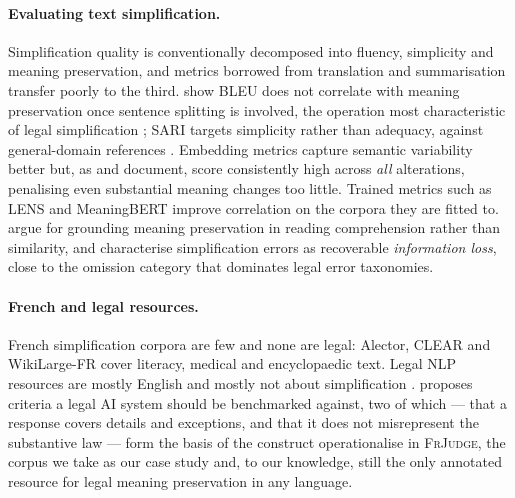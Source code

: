 \documentclass[11pt]{article}
\begin{document}
\paragraph{Evaluating text simplification.}
Simplification quality is conventionally decomposed into fluency, simplicity and
meaning preservation, and metrics borrowed from translation and summarisation
transfer poorly to the third. \citet{sulem2018bleu} show BLEU
\citep{papineni2002bleu} does not correlate with meaning preservation once
sentence splitting is involved, the operation most characteristic of legal
simplification \citep{garimella2022text}; SARI
\citep{xu-etal-2016-optimizing} targets simplicity rather than adequacy, against
general-domain references \citep{alvamanchego2020asset}. Embedding metrics
\citep{zhang2019bertscore,reimers2019sbert} capture semantic variability better
but, as \citet{cripwell2024document} and \citet{kew2023bless} document, score
consistently high across \emph{all} alterations, penalising even substantial
meaning changes too little. Trained metrics such as LENS
\citep{maddela2023lens} and MeaningBERT \citep{beauchemin2023meaningbert}
improve correlation on the corpora they are fitted to.
\citet{agrawal2024meaning} argue for grounding meaning preservation in reading
comprehension rather than similarity, and \citet{trienes2024infolossqa}
characterise simplification errors as recoverable \emph{information loss},
close to the omission category that dominates legal error taxonomies.

\paragraph{French and legal resources.}
French simplification corpora are few and none are legal: Alector, CLEAR
\citep{grabar2018clear} and WikiLarge-FR \citep{cardon2020wikilargefr} cover
literacy, medical and encyclopaedic text. Legal NLP resources are mostly English
and mostly not about simplification \citep{hendrycks2021cuad,garneau2022criminal}.
\citet{hagan2023good} proposes criteria a legal AI system should be benchmarked
against, two of which --- that a response covers details and exceptions, and
that it does not misrepresent the substantive law --- form the basis of the
construct \citet{beauchemin2025judgebert} operationalise in \textsc{FrJudge},
the corpus we take as our case study and, to our knowledge, still the only
annotated resource for legal meaning preservation in any language.
\end{document}

